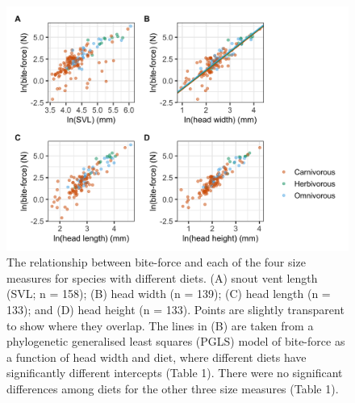 \documentclass[a4paper, 12pt]{article}
\begin{document}
\newpage
\begin{figure}[h]
 \centering
  \includegraphics[width = \linewidth]{figures/bodysize-bite-force-diet.png}
  \caption{The relationship between bite-force and each of the four size measures for species with different diets. 
  (A) snout vent length (SVL; n = 158); (B) head width (n = 139); (C) head length (n = 133); and (D) head height (n = 133). 
  Points are slightly transparent to show where they overlap. 
  The lines in (B) are taken from a phylogenetic generalised least squares (PGLS) model of bite-force as a function of head width and diet, where different diets have significantly different intercepts (Table 1). 
  There were no significant differences among diets for the other three size measures (Table 1). 
}
  \label{fig-diet}
\end{figure}
\end{document}
